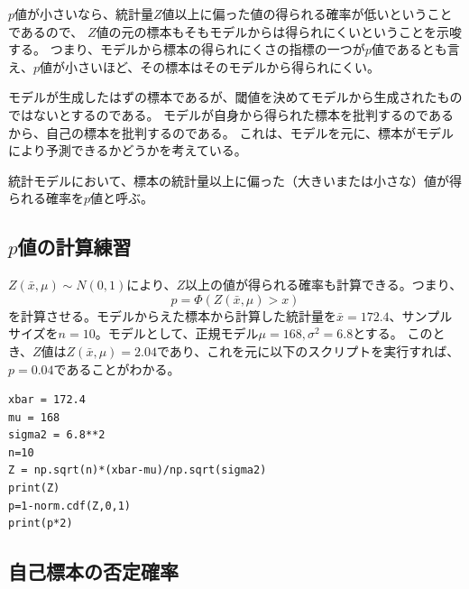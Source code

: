 $p$値が小さいなら、統計量$Z$値以上に偏った値の得られる確率が低いということであるので、
$Z$値の元の標本もそもモデルからは得られにくいということを示唆する。
つまり、モデルから標本の得られにくさの指標の一つが$p$値であるとも言え、$p$値が小さいほど、その標本はそのモデルから得られにくい。


モデルが生成したはずの標本であるが、閾値を決めてモデルから生成されたものではないとするのである。
モデルが自身から得られた標本を批判するのであるから、自己の標本を批判するのである。
これは、モデルを元に、標本がモデルにより予測できるかどうかを考えている。


\begin{defi}
    統計モデルにおいて、標本の統計量以上に偏った（大きいまたは小さな）値が得られる確率を$p$値と呼ぶ。
\end{defi}


\subsection{$p$値の計算練習}
$Z(\bar{x},\mu)\sim N(0,1)$により、$Z$以上の値が得られる確率も計算できる。つまり、
\begin{equation*}
    p = \varPhi(Z(\bar{x},\mu)>x)
\end{equation*}
を計算させる。モデルからえた標本から計算した統計量を$\bar{x}=172.4$、サンプルサイズを$n=10$。モデルとして、正規モデル$\mu=168,\sigma^2=6.8$とする。
このとき、$Z$値は$Z(\bar{x},\mu)=2.04$であり、これを元に以下のスクリプトを実行すれば、$p=0.04$であることがわかる。

\begin{lstlisting}
xbar = 172.4
mu = 168
sigma2 = 6.8**2
n=10
Z = np.sqrt(n)*(xbar-mu)/np.sqrt(sigma2)
print(Z)
p=1-norm.cdf(Z,0,1)
print(p*2)
\end{lstlisting}



\subsection{自己標本の否定確率}

